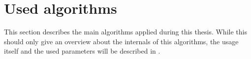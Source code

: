 \section{Used algorithms}

This section describes the main algorithms applied during this thesis. While this should only give an overview about the internals of this algorithms, the usage itself and the used parameters will be described in .






%